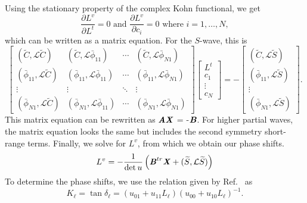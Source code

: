 \documentclass[preprint,showpacs,showkeys,preprintnumbers,amsmath,amssymb,longbibliography,pra,aps]{revtex4-1}
\begin{document}
Using the stationary property of the complex Kohn functional, we get
\begin{equation}
\frac{\partial L^v}{\partial L^t} = 0  \text{ and }
  \frac{\partial L^v}{\partial c_i} = 0 \text{ where $i = 1,\ldots,N$},
\label{eq:ComplexKohnStationary}
\end{equation}
which can be written as a matrix equation. For the $S$-wave, this is
\begin{equation}
\label{eq:ComplexKohnMatrix}
\begin{bmatrix} 
 (\widetilde{C},\mathcal{L}\widetilde{C}) & (\widetilde{C},\mathcal{L}\bar{\phi}_{11}) & \cdots & (\widetilde{C},\mathcal{L}\bar{\phi}_{N1})\\
 (\bar{\phi}_{11},\mathcal{L}\widetilde{C}) & (\bar{\phi}_{11},\mathcal{L}\bar{\phi}_{11}) & \cdots & (\bar{\phi}_{11},\mathcal{L}\bar{\phi}_{N1})\\
 \vdots & \vdots & \ddots & \vdots \\
 (\bar{\phi}_{N1},\mathcal{L}\widetilde{C}) & (\bar{\phi}_{N1},\mathcal{L}\bar{\phi}_{11}) & \cdots & (\bar{\phi}_{N1},\mathcal{L}\bar{\phi}_{N1})
\end{bmatrix}
\begin{bmatrix}
L^t\\
c_1\\
\vdots\\
c_N
\end{bmatrix}
= -
\begin{bmatrix}
(\widetilde{C},\mathcal{L}\widetilde{S}) \\
(\bar{\phi}_{11},\mathcal{L}\widetilde{S}) \\
\vdots \\
(\bar{\phi}_{N1},\mathcal{L}\widetilde{S})
\end{bmatrix}.
\end{equation}
This matrix equation can be rewritten as
$\textbf{\emph{AX}}$ = -$\textbf{\emph{B}}$. For higher partial waves,
the matrix equation looks the same but includes the second symmetry
short-range terms. Finally, we solve for $L^v$, from which we obtain our
phase shifts.
\begin{equation}
L^v = -\frac{1}{\det u} \left( \textbf{\emph{B}}^{tr} \textbf{\emph{X}} +
  (\widetilde{S},\mathcal{L} \widetilde{S}) \right)
\end{equation}
To determine the phase shifts, we use the relation given by Ref.~\cite{Lucchese1989} as
\begin{equation}
\label{eq:GenKohnL}
K_\ell = \tan \delta_\ell = (u_{01} + u_{11} L_\ell)(u_{00} + u_{10}
  L_\ell)^{-1}.
\end{equation}
\end{document}
